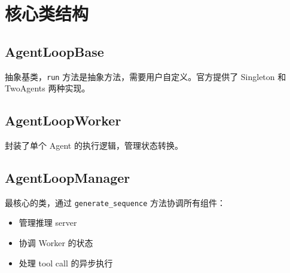 \section{核心类结构}
\subsection{AgentLoopBase}
抽象基类，\texttt{run} 方法是抽象方法，需要用户自定义。官方提供了 Singleton 和 TwoAgents 两种实现。

\subsection{AgentLoopWorker}
封装了单个 Agent 的执行逻辑，管理状态转换。

\subsection{AgentLoopManager}
最核心的类，通过 \texttt{generate\_sequence} 方法协调所有组件：
\begin{itemize}
  \item 管理推理 server
  \item 协调 Worker 的状态
  \item 处理 tool call 的异步执行
\end{itemize}

